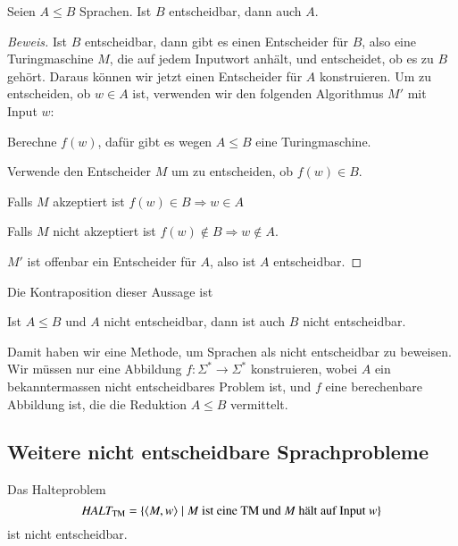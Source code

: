 \begin{satz}
Seien $A\le B$ Sprachen.
Ist $B$ entscheidbar, dann auch $A$.
\end{satz}

\begin{proof}[Beweis]
Ist $B$ entscheidbar, dann gibt es einen Entscheider für $B$, also
eine Turingmaschine $M$, die auf jedem Inputwort anhält, und
entscheidet, ob es zu $B$ gehört.
Daraus können wir jetzt einen Entscheider für $A$ konstruieren.
Um zu entscheiden, ob $w\in A$
ist, verwenden wir den folgenden Algorithmus $M'$ mit Input
$w$:
\medskip
\begin{compactenum}
\item Berechne $f(w)$, dafür gibt es wegen $A\le B$ eine Turingmaschine.
\item Verwende den Entscheider $M$ um zu entscheiden, ob $f(w)\in B$.
\item Falls $M$ akzeptiert ist $f(w)\in B\Rightarrow w\in A$
\item Falls $M$ nicht akzeptiert ist $f(w)\not\in B\Rightarrow w\not\in A$.
\end{compactenum}
\medskip
$M'$ ist offenbar ein Entscheider für $A$, also ist $A$ entscheidbar.
\end{proof}

Die Kontraposition dieser Aussage ist
\begin{satz}
Ist $A\le B$ und $A$ nicht entscheidbar, dann ist auch $B$ nicht
entscheidbar.
\end{satz}
Damit haben wir eine Methode, um Sprachen als nicht entscheidbar 
zu beweisen.
Wir müssen nur eine Abbildung $f\colon \Sigma^*\to \Sigma^*$
konstruieren, wobei $A$ ein bekanntermassen nicht
entscheidbares Problem ist, und $f$ eine berechenbare Abbildung ist,
die die Reduktion $A\le B$ vermittelt.

\subsection{Weitere nicht entscheidbare Sprachprobleme}
%
\begin{satz} Das Halteproblem
\[
\text{\it HALT}_{\text{TM}}=\{\langle M,w\rangle\;|\;
\text{$M$ ist eine TM und $M$ hält auf Input $w$}\}
\]
%
ist nicht entscheidbar.
\end{satz}

